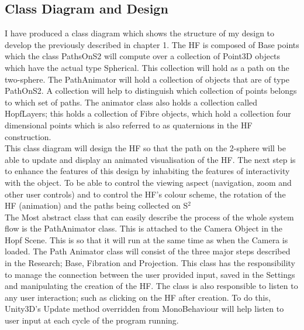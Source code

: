 \documentclass[12pt]{article} %
\begin{document}
\begin{flushleft}
\subsection{Class Diagram and Design} %
I have produced a class diagram which shows the structure of my design to develop the previously described in chapter 1. The HF is composed of Base points which the class PathsOnS2 will compute over a collection of Point3D objects which have the actual type Spherical. This collection will hold as a path on the two-sphere. The PathAnimator will hold a collection of objects that are of type PathOnS2. A collection will help to distinguish which collection of points belongs to which set of paths. The animator class also holds a collection called HopfLayers; this holds a collection of Fibre objects, which hold a collection four dimensional points which is also referred to as quaternions in the HF construction.  \\
This class diagram will design the HF so that the path on the 2-sphere will be able to update and display an animated visualisation of the HF. The next step is to enhance the features of this design by inhabiting the features of interactivity with the object. To be able to control the viewing aspect (navigation, zoom and other user controls) and to control the HF’s colour scheme, the rotation of the HF (animation) and the paths being collected on S$^{2}$  \\
The Most abstract class that can easily describe the process of the whole system flow is the PathAnimator class. This is attached to the Camera Object in the Hopf Scene. This is so that it will run at the same time as when the Camera is loaded. The Path Animator class will consist of the three major steps described in the Research; Base, Fibration and Projection. This class has the responsibility to manage the connection between the user provided input, saved in the Settings and manipulating the creation of the HF. 
The class is also responsible to listen to any user interaction; such as clicking on the HF after creation. To do this, Unity3D's Update method overridden from MonoBehaviour will help listen to user input at each cycle of the program running.
\begin{figure}[H] %

\end{figure}
\end{flushleft}
\end{document}
